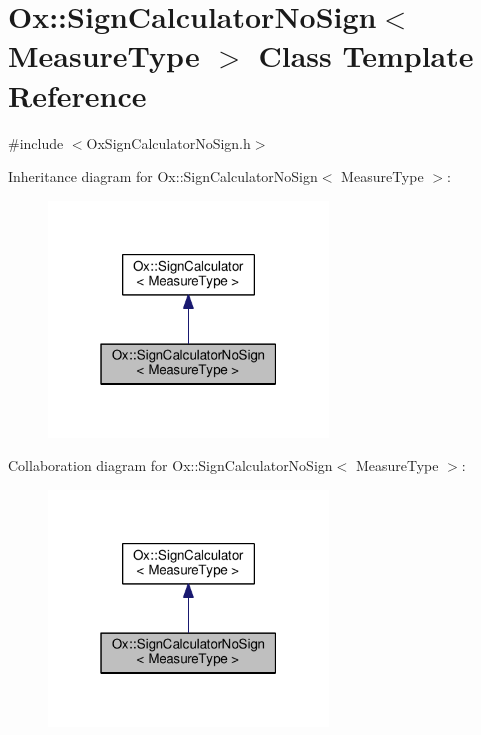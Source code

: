 \hypertarget{class_ox_1_1_sign_calculator_no_sign}{}\section{Ox\+:\+:Sign\+Calculator\+No\+Sign$<$ Measure\+Type $>$ Class Template Reference}
\label{class_ox_1_1_sign_calculator_no_sign}


{\ttfamily \#include $<$Ox\+Sign\+Calculator\+No\+Sign.\+h$>$}



Inheritance diagram for Ox\+:\+:Sign\+Calculator\+No\+Sign$<$ Measure\+Type $>$\+:
\nopagebreak
\begin{figure}[H]
\begin{center}
\leavevmode
\includegraphics[width=211pt]{class_ox_1_1_sign_calculator_no_sign__inherit__graph}
\end{center}
\end{figure}


Collaboration diagram for Ox\+:\+:Sign\+Calculator\+No\+Sign$<$ Measure\+Type $>$\+:
\nopagebreak
\begin{figure}[H]
\begin{center}
\leavevmode
\includegraphics[width=211pt]{class_ox_1_1_sign_calculator_no_sign__coll__graph}
\end{center}
\end{figure}
